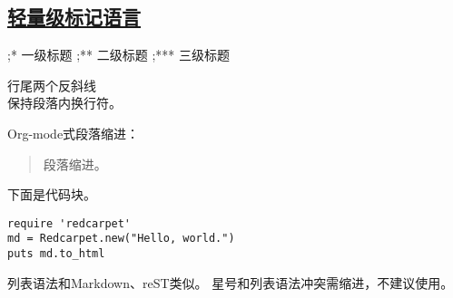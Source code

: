 \documentclass[11pt]{ctexart}
\begin{document}
\subsection{\href{http://www.worldhello.net/gotgithub/appendix/markups.html}{轻量级标记语言}}
\label{sec:orgc6987a5}
;* 一级标题
;** 二级标题
;*** 三级标题

行尾两个反斜线\\
保持段落内换行符。

Org-mode式段落缩进：

\begin{quote}
段落缩进。
\end{quote}

下面是代码块。

\lstset{language=Ruby,label= ,caption= ,captionpos=b,numbers=none}
\begin{lstlisting}
require 'redcarpet'
md = Redcarpet.new("Hello, world.")
puts md.to_html
\end{lstlisting}

列表语法和Markdown、reST类似。
星号和列表语法冲突需缩进，不建议使用。
\end{document}
